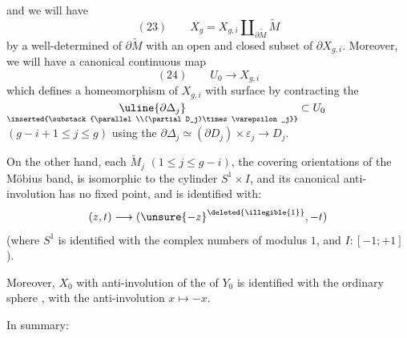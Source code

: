 
and we will have
\[
(23)\qquad X_g=X_{g,i}\amalg_{\partial\widetilde M}\widetilde M
\]
by a well-determined  of $\partial\widetilde M$ with an open and closed subset of $\partial X_{g,i}$. Moreover, we will have a canonical continuous map
\[
(24)\qquad U_0\longrightarrow X_{g,i}
\]
which defines a homeomorphism of $X_{g,i}$ with   surface  by contracting the $\underset{\inserted{\substack{\parallel\\(\partial D_j)\times\varepsilon_j}}}{\uline{\partial\Delta_j}}\subset U_0$ $(g-i+1\leq j\leq g)$ using the  $\partial\Delta_j\simeq(\partial D_j)\times\varepsilon_j\longrightarrow D_j$.

On the other hand, each $\widetilde M_j$ $(1\leq j\leq g-i)$, the covering  orientations of the Möbius band, is isomorphic to the cylinder $S^1\times I$, and its canonical anti-involution  has no fixed point, and is identified with:
\[
(z,t)\longrightarrow(\unsure{-z}^{\deleted{\illegible{1}}},-t)
\]
(where $S^1$ is identified with the complex numbers of modulus $1$, and $I:[-1;+1]$).

Moreover, $X_0$  with  anti-involution of the  of $Y_0$ is identified with the ordinary sphere , with the anti-involution $x\longmapsto-x$.


In summary:

